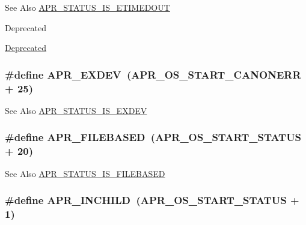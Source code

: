 \begin{DoxySeeAlso}{See Also}
\hyperlink{group___a_p_r___s_t_a_t_u_s___i_s_ga6adc2f539eabedb504294458be4f6251}{A\-P\-R\-\_\-\-S\-T\-A\-T\-U\-S\-\_\-\-I\-S\-\_\-\-E\-T\-I\-M\-E\-D\-O\-U\-T} 
\end{DoxySeeAlso}
\begin{DoxyRefDesc}{Deprecated}
\item[\hyperlink{deprecated__deprecated000001}{Deprecated}]\end{DoxyRefDesc}
\hypertarget{group___a_p_r___error_ga0562023bd8ebe580b9bbb9f7b04d3f5d}{
\subsubsection[{A\-P\-R\-\_\-\-E\-X\-D\-E\-V}]{\setlength{\rightskip}{0pt plus 5cm}\#define A\-P\-R\-\_\-\-E\-X\-D\-E\-V~({\bf A\-P\-R\-\_\-\-O\-S\-\_\-\-S\-T\-A\-R\-T\-\_\-\-C\-A\-N\-O\-N\-E\-R\-R} + 25)}}\label{group___a_p_r___error_ga0562023bd8ebe580b9bbb9f7b04d3f5d}
\begin{DoxySeeAlso}{See Also}
\hyperlink{group___a_p_r___s_t_a_t_u_s___i_s_ga1a11d6ff007e40f93f9db1b3c6e76617}{A\-P\-R\-\_\-\-S\-T\-A\-T\-U\-S\-\_\-\-I\-S\-\_\-\-E\-X\-D\-E\-V} 
\end{DoxySeeAlso}
\hypertarget{group___a_p_r___error_ga28a6d59b62d2698208451a9343399fbb}{
\subsubsection[{A\-P\-R\-\_\-\-F\-I\-L\-E\-B\-A\-S\-E\-D}]{\setlength{\rightskip}{0pt plus 5cm}\#define A\-P\-R\-\_\-\-F\-I\-L\-E\-B\-A\-S\-E\-D~({\bf A\-P\-R\-\_\-\-O\-S\-\_\-\-S\-T\-A\-R\-T\-\_\-\-S\-T\-A\-T\-U\-S} + 20)}}\label{group___a_p_r___error_ga28a6d59b62d2698208451a9343399fbb}
\begin{DoxySeeAlso}{See Also}
\hyperlink{group___a_p_r___s_t_a_t_u_s___i_s_ga7e46240d526e81f5ffbc266ca29b9f6a}{A\-P\-R\-\_\-\-S\-T\-A\-T\-U\-S\-\_\-\-I\-S\-\_\-\-F\-I\-L\-E\-B\-A\-S\-E\-D} 
\end{DoxySeeAlso}
\hypertarget{group___a_p_r___error_ga5a2bb63099778699feeae9627474c179}{
\subsubsection[{A\-P\-R\-\_\-\-I\-N\-C\-H\-I\-L\-D}]{\setlength{\rightskip}{0pt plus 5cm}\#define A\-P\-R\-\_\-\-I\-N\-C\-H\-I\-L\-D~({\bf A\-P\-R\-\_\-\-O\-S\-\_\-\-S\-T\-A\-R\-T\-\_\-\-S\-T\-A\-T\-U\-S} + 1)}}\label{group___a_p_r___error_ga5a2bb63099778699feeae9627474c179}
